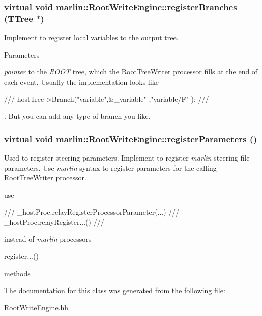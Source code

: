 \subsubsection[{registerBranches}]{\setlength{\rightskip}{0pt plus 5cm}virtual void marlin::RootWriteEngine::registerBranches (TTree $\ast$)\hspace{0.3cm}{\ttfamily  [pure virtual]}}\label{classmarlin_1_1RootWriteEngine_ad467dc6e73fdd9fd4311f7277fd02a89}


Implement to register local variables to the output tree. 
\begin{DoxyParams}{Parameters}
\item[{\em pointer}]to the {\itshape ROOT\/} tree, which the RootTreeWriter processor fills at the end of each event. Usually the implementation looks like \begin{DoxyVerb}
    /// hostTree->Branch("variable",&_variable" ,"variable/F"  );
    /// \end{DoxyVerb}
. But you can add any type of branch you like. \end{DoxyParams}
\subsubsection[{registerParameters}]{\setlength{\rightskip}{0pt plus 5cm}virtual void marlin::RootWriteEngine::registerParameters ()\hspace{0.3cm}{\ttfamily  [pure virtual]}}\label{classmarlin_1_1RootWriteEngine_ae12b70923768043fa5c1438f078c41d3}


Used to register steering parameters. Implement to register {\itshape marlin\/} steering file parameters. Use {\itshape marlin\/} syntax to register parameters for the calling RootTreeWriter processor.

use \begin{DoxyVerb}
    /// _hostProc.relayRegisterProcessorParameter(...)
    /// _hostProc.relayRegister...()
    /// \end{DoxyVerb}
 instead of {\itshape marlin\/} processors \begin{DoxyVerb}register...() \end{DoxyVerb}
 methods 

The documentation for this class was generated from the following file:\begin{DoxyCompactItemize}
\item 
RootWriteEngine.hh\end{DoxyCompactItemize}

